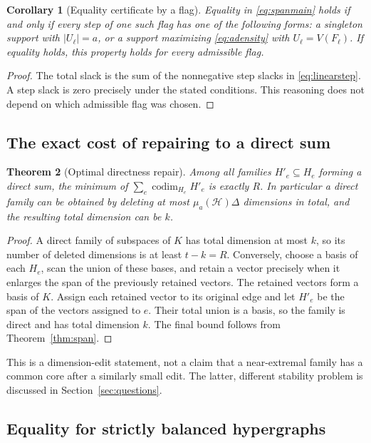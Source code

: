 \documentclass[11pt]{article}
\newtheorem{theorem}{Theorem}[section]
\newtheorem{corollary}[theorem]{Corollary}
\theoremstyle{definition}
\theoremstyle{remark}
\newcommand{\1}{\mathbf 1}
\newcommand{\codim}{\operatorname{codim}}
\begin{document}
\begin{corollary}[Equality certificate by a flag]
\label{cor:flag}
Equality in \eqref{eq:spanmain} holds if and only if every step of one such flag
has one of the following forms: a singleton support with $|U_\ell|=a$, or a
support maximizing \eqref{eq:adensity} with $U_\ell=V(F_\ell)$.
If equality holds, this property holds for every admissible flag.
\end{corollary}

\begin{proof}
The total slack is the sum of the nonnegative step slacks in
\eqref{eq:linearstep}. A step slack is zero precisely under the stated
conditions. This reasoning does not depend on which admissible flag was chosen.
\end{proof}

\subsection{The exact cost of repairing to a direct sum}

\begin{theorem}[Optimal directness repair]
\label{thm:repair}
Among all families $H'_e\subseteq H_e$ forming a direct sum, the minimum of
$\sum_e\codim_{H_e}H'_e$ is exactly $R$. In particular a direct family can be
obtained by deleting at most $\mu_a(\mathcal H)\Delta$ dimensions in total,
and the resulting total dimension can be $k$.
\end{theorem}

\begin{proof}
A direct family of subspaces of $K$ has total dimension at most $k$, so its
number of deleted dimensions is at least $t-k=R$. Conversely, choose a basis
of each $H_e$, scan the union of these bases, and retain a vector precisely
when it enlarges the span of the previously retained vectors. The retained
vectors form a basis of $K$. Assign each retained vector to its original edge
and let $H'_e$ be the span of the vectors assigned to $e$. Their total union
is a basis, so the family is direct and has total dimension $k$.
The final bound follows from Theorem~\ref{thm:span}.
\end{proof}

This is a dimension-edit statement, not a claim that a near-extremal family has
a common core after a similarly small edit. The latter, different stability
problem is discussed in Section~\ref{sec:questions}.

\subsection{Equality for strictly balanced hypergraphs}
\end{document}
